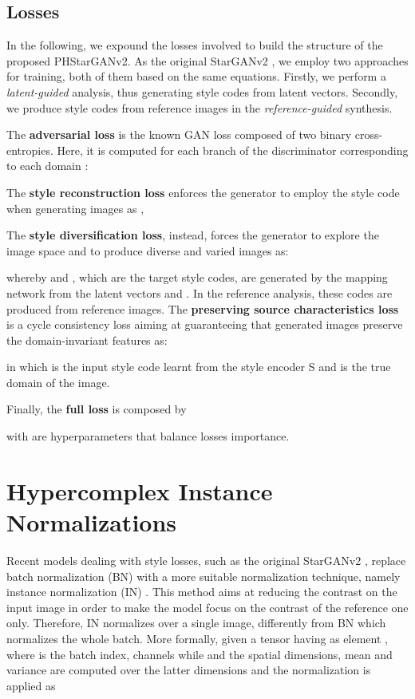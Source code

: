 \documentclass[conference]{IEEEtran}
\begin{document}
\subsection{Losses}

In the following, we expound the losses involved to build the structure of the proposed PHStarGANv2. As the original StarGANv2 \cite{Choi2020StarGAN2}, we employ two approaches for training, both of them based on the same equations. Firstly, we perform a \textit{latent-guided} analysis, thus generating style codes from latent vectors. Secondly, we produce style codes from reference images in the \textit{reference-guided} synthesis. 

The \textbf{adversarial loss} is the known GAN loss \cite{GoodfellowNIPS2014} composed of two binary cross-entropies. Here, it is computed for each branch of the discriminator corresponding to each domain :

\noindent The \textbf{style reconstruction loss} enforces the generator to employ the style code  when generating images as ,

\noindent The \textbf{style diversification loss}, instead, forces the generator to explore the image space and to produce diverse and varied images as:

\noindent whereby  and , which are the target style codes, are generated by the mapping network from the latent vectors  and . In the reference analysis, these codes are produced from reference images.
The \textbf{preserving source characteristics loss} is a cycle consistency loss aiming at guaranteeing that generated images preserve the domain-invariant features as:

\noindent in which  is the input  style code learnt from the style encoder S and  is the true domain of the image. 

\noindent Finally, the \textbf{full loss} is composed by

\noindent with  are hyperparameters that balance losses importance.

\section{Hypercomplex Instance Normalizations}
\label{sec:qinst}


Recent models dealing with style losses, such as the original StarGANv2 \cite{Choi2020StarGAN2}, replace batch normalization (BN) with a more suitable normalization technique, namely instance normalization (IN) \cite{8099920}. This method aims at reducing the contrast on the input image in order to make the model focus on the contrast of the reference one only. Therefore, IN normalizes over a single image, differently from BN which normalizes the whole batch. More formally, given a tensor  having as element , where  is the batch index,  channels while  and  the spatial dimensions, mean  and variance  are computed over the latter dimensions and the normalization is applied as
\end{document}
